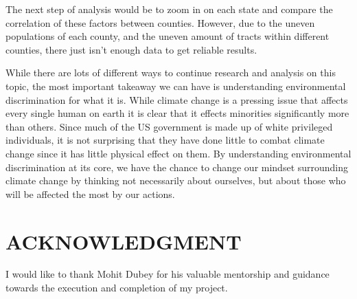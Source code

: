 \documentclass[letterpaper, 10 pt, conference]{ieeeconf}  %
\begin{document}
The next step of analysis would be to zoom in on each state and compare the correlation of these factors between counties. However, due to the uneven populations of each county, and the uneven amount of tracts within different counties, there just isn't enough data to get reliable results. \par

While there are lots of different ways to continue research and analysis on this topic, the most important takeaway we can have is understanding environmental discrimination for what it is. While climate change is a pressing issue that affects every single human on earth it is clear that it effects minorities significantly more than others. Since much of the US government is made up of white privileged individuals, it is not surprising that they have done little to combat climate change since it has little physical effect on them. By understanding environmental discrimination at its core, we have the chance to change our mindset surrounding climate change by thinking not necessarily about ourselves, but about those who will be affected the most by our actions.\par


\addtolength{\textheight}{-12cm}   %










\section*{ACKNOWLEDGMENT}

I would like to thank Mohit Dubey for his valuable mentorship and guidance towards the execution and completion of my project.


\printbibliography
\nocite{*}

\end{document}
